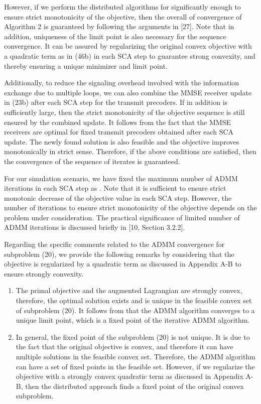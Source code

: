 \begin{enumerate}
However, if we perform the distributed algorithms for significantly enough to ensure strict monotonicity of the objective, then the overall of convergence of Algorithm 2 is guaranteed by following the arguments in [27]. Note that in addition, uniqueness of the limit point is also necessary for the sequence convergence. It can be assured by regularizing the original convex objective with a quadratic term as in (46b) in each \ac{SCA} step to guarantee strong convexity, and thereby ensuring a unique minimizer and limit point.

Additionally, to reduce the signaling overhead involved with the information exchange due to multiple loops, we can also combine the \ac{MMSE} receiver update in (23b) after each \ac{SCA} step for the transmit precoders. If in addition  is sufficiently large, then the strict monotonicity of the objective sequence is still ensured by the combined update. It follows from the fact that the \ac{MMSE} receivers are optimal for fixed transmit precoders obtained after each \ac{SCA} update. The newly found solution is also feasible and the objective improves monotonically in strict sense. Therefore, if the above conditions are satisfied, then the convergence of the sequence of iterates is guaranteed. 

For our simulation scenario, we have fixed the maximum number of \ac{ADMM} iterations in each \ac{SCA} step as . Note that it is sufficient to ensure strict monotonic decrease of the objective value in each \ac{SCA} step. However, the number of iterations to ensure strict monotonicity of the objective depends on the problem under consideration. The practical significance of limited number of \ac{ADMM} iterations is discussed briefly in [10, Section 3.2.2].

Regarding the specific comments related to the \ac{ADMM} convergence for subproblem (20), we provide the following remarks by considering that the objective is regularized by a quadratic term as discussed in Appendix A-B to ensure strongly convexity.

\begin{enumerate}
\item The primal objective and the augmented Lagrangian are strongly convex, therefore, the optimal solution exists and is unique in the feasible convex set of subproblem (20). It follows from that the \ac{ADMM} algorithm converges to a unique limit point, which is a fixed point of the iterative \ac{ADMM} algorithm.

\item In general, the fixed point of the subproblem (20) is not unique. It is due to the fact that the original objective is convex, and therefore it can have multiple solutions in the feasible convex set. Therefore, the \ac{ADMM} algorithm can have a set of fixed points in the feasible set. However, if we regularize the objective with a strongly convex quadratic term as discussed in Appendix A-B, then the distributed approach finds a fixed point of the original convex subproblem.


\end{enumerate}
\end{enumerate}
